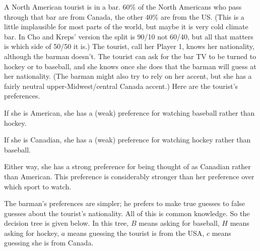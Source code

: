 A North American tourist is in a bar. 60\% of the North Americans who pass through that bar are from Canada, the other 40\% are from the US. (This is a little implausible for most parts of the world, but maybe it is very cold climate bar. In Cho and Kreps' version the split is 90/10 not 60/40, but all that matters is which side of 50/50 it is.) The tourist, call her Player 1, knows her nationality, although the barman doesn't. The tourist can ask for the bar TV to be turned to hockey or to baseball, and she knows once she does that the barman will guess at her nationality. (The barman might also try to rely on her accent, but she has a fairly neutral upper-Midwest/central Canada accent.) Here are the tourist's preferences.

\begin{itemize*}
\item If she is American, she has a (weak) preference for watching baseball rather than hockey.
\item If she is Canadian, she has a (weak) preference for watching hockey rather than baseball.
\item Either way, she has a strong preference for being thought of as Canadian rather than American. This preference is considerably stronger than her preference over which sport to watch.
\end{itemize*}

\noindent The barman's preferences are simpler; he prefers to make true guesses to false guesses about the tourist's nationality. All of this is common knowledge. So the decision tree is given below. In this tree, $B$ means asking for baseball, $H$ means asking for hockey, $a$ means guessing the tourist is from the USA, $c$ means guessing she is from Canada.

